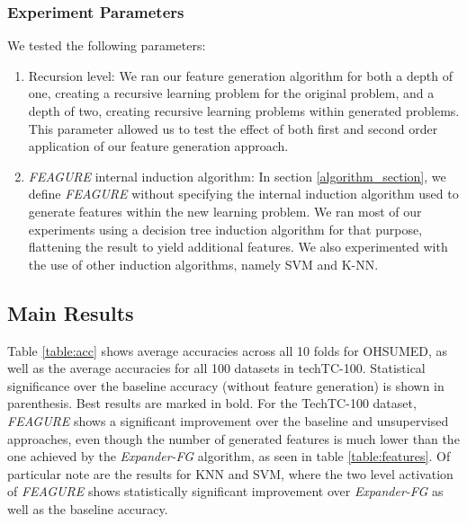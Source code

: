 \documentclass[twoside,11pt]{article}
\theoremstyle{definition}
\begin{document}
\subsubsection{Experiment Parameters}

We tested the following parameters: 
\begin{enumerate}
	\item Recursion level: We ran our feature generation algorithm for both a depth of one, creating a recursive learning problem for the original problem, and a depth of two, creating recursive learning problems within generated problems. This parameter allowed us to test the effect of both first and second order application of our feature generation approach.

	\item \emph{FEAGURE} internal induction algorithm: In section \ref{algorithm_section}, we define \emph{FEAGURE} without specifying the internal induction algorithm used to generate features within the new learning problem. We ran most of our experiments using a decision tree induction algorithm for that purpose, flattening the result to yield additional features. We also experimented with the use of other induction algorithms, namely SVM and K-NN.
	
\end{enumerate}


\subsection{Main Results}

Table \ref{table:acc} shows average accuracies across all 10 folds for OHSUMED, as well as the average accuracies for all 100 datasets in techTC-100. Statistical significance over the baseline accuracy (without feature generation) is shown in parenthesis. Best results are marked in bold.
For the TechTC-100 dataset, \emph{FEAGURE} shows a significant improvement over the baseline and unsupervised approaches, even though the number of generated features is much lower than the one achieved by the \emph{Expander-FG} algorithm, as seen in table \ref{table:features}.
Of particular note are the results for KNN and SVM, where the two level activation of \emph{FEAGURE} shows statistically significant improvement over \emph{Expander-FG} as well as the baseline accuracy. 
\end{document}
